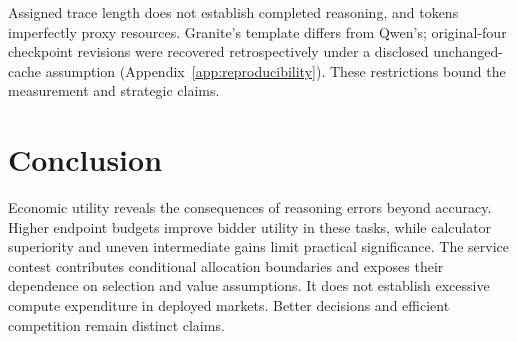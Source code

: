 \documentclass{article}
\begin{document}
Assigned trace length does not establish completed reasoning, and tokens imperfectly proxy resources. Granite's template differs from Qwen's; original-four checkpoint revisions were recovered retrospectively under a disclosed unchanged-cache assumption (Appendix~\ref{app:reproducibility}). These restrictions bound the measurement and strategic claims.

\section{Conclusion}

Economic utility reveals the consequences of reasoning errors beyond accuracy. Higher endpoint budgets improve bidder utility in these tasks, while calculator superiority and uneven intermediate gains limit practical significance. The service contest contributes conditional allocation boundaries and exposes their dependence on selection and value assumptions. It does not establish excessive compute expenditure in deployed markets. Better decisions and efficient competition remain distinct claims.




\clearpage
\appendix
\raggedbottom
\end{document}
